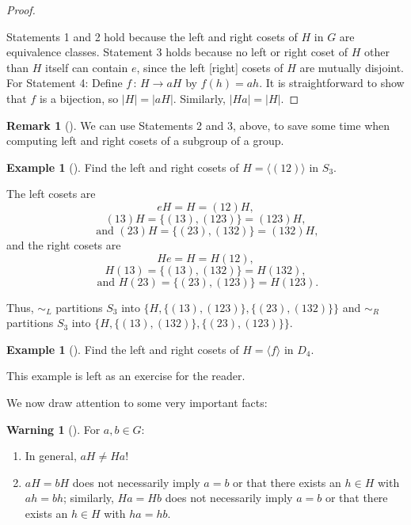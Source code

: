 \documentclass[10pt,openany,oneside]{book}
\theoremstyle{plain}
\theoremstyle{definition}
\theoremstyle{definition}
\newtheorem{remark}[theorem]{Remark}
\newtheorem{warning}[theorem]{Warning}
\theoremstyle{definition}
\newtheorem{example}[theorem]{Example}
\theoremstyle{definition}
\numberwithin{equation}{section}
\def\siml{\sim_L}
\def\simr{\sim_R}
\begin{document}
\begin{proof}\hypertarget{proof-37}{}
Statements 1 and 2 hold because the left and right cosets of \(H\) in \(G\) are equivalence classes. Statement 3 holds because no left or right coset of \(H\) other than \(H\) itself can contain \(e\), since the left [right] cosets of \(H\) are mutually disjoint. For Statement 4: Define \(f\,:\,H\to aH\) by \(f(h)=ah\). It is straightforward to show that \(f\) is a bijection, so \(|H|=|aH|\). Similarly, \(|Ha|=|H|\).%
\end{proof}
\begin{remark}[]\label{remark-39}
We can use Statements 2 and 3, above, to save some time when computing left and right cosets of a subgroup of a group.%
\end{remark}
\begin{example}[]\label{s3_ex}
Find the left and right cosets of \(H=\langle (12)\rangle\) in \(S_3\).%
\par
The left cosets are%
\begin{equation*}
eH=H=(12)H,
\end{equation*}
%
\begin{equation*}
(13)H=\{(13),(123)\}=(123)H,
\end{equation*}
%
\begin{equation*}
\text{ and } (23)H=\{(23),(132)\}=(132)H,
\end{equation*}
and the right cosets are%
\begin{equation*}
He=H=H(12),
\end{equation*}
%
\begin{equation*}
H(13)=\{(13),(132)\}=H(132),
\end{equation*}
%
\begin{equation*}
\text{ and } H(23)=\{(23),(123)\}=H(123).
\end{equation*}
%
\par
Thus, \(\siml\) partitions \(S_3\) into \(\{H,\{(13),(123)\},\{(23),
(132)\}\}\) and \(\simr\) partitions \(S_3\) into \(\{H,\{(13),(132)\},\{(23), (123)\}\}\).%
\end{example}
\begin{example}[]\label{d4_ex}
Find the left and right cosets of \(H=\langle f\rangle\) in \(D_4\).%
\par
This example is left as an exercise for the reader.%
\end{example}
We now draw attention to some very important facts:%
\begin{warning}[]\label{warning-20}
For \(a,b\in G\): \leavevmode%
\begin{enumerate}
\item\hypertarget{li-412}{}In general, \(aH \neq Ha\)!%
\item\hypertarget{li-413}{}\(aH=bH\) does not necessarily imply \(a=b\) or that there exists an \(h\in H\) with \(ah=bh\); similarly, \(Ha=Hb\) does not necessarily imply \(a=b\) or that there exists an \(h\in H\) with \(ha=hb\).%
\end{enumerate}
%
\end{warning}
\end{document}
